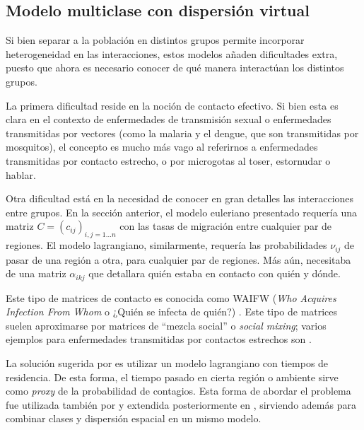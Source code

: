 \subsection{Modelo multiclase con dispersión virtual}\label{modelo-clases-vs-ambientes}

Si bien separar a la población en distintos grupos permite incorporar heterogeneidad en las interacciones, estos modelos añaden dificultades extra, puesto que ahora es necesario conocer de qué manera interactúan los distintos grupos.

La primera dificultad reside en la noción de contacto efectivo. Si bien esta es clara en el contexto de enfermedades de transmisión sexual o enfermedades transmitidas por vectores (como la malaria y el dengue, que son transmitidas por mosquitos), el concepto es mucho más vago al referirnos a enfermedades transmitidas por contacto estrecho, o por microgotas al toser, estornudar o hablar.

Otra dificultad está en la necesidad de conocer en gran detalles las interacciones entre grupos. En la sección anterior, el modelo euleriano presentado requería una matriz \(C = (c_{ij})_{i,j = 1 \dots n} \) con las tasas de migración entre cualquier par de regiones. El modelo lagrangiano, similarmente, requería las probabilidades \(\nu_{ij}\) de pasar de una región a otra, para cualquier par de regiones. Más aún, necesitaba de una matriz \(\alpha_{ikj}\) que detallara quién estaba en contacto con quién y dónde.

Este tipo de matrices de contacto es conocida como WAIFW (\textit{Who Acquires Infection From Whom} o ¿Quién se infecta de quién?) \cite{Anderson1992}. Este tipo de matrices suelen aproximarse por matrices de ``mezcla social'' o \textit{social mixing}; varios ejemplos para enfermedades transmitidas por contactos estrechos son \cite{Wallinga2006}\cite{Edmunds2006}\cite{Mossong2008}.

La solución sugerida por \cite{Bichara2015} es utilizar un modelo lagrangiano con tiempos de residencia. De esta forma, el tiempo pasado en cierta región o ambiente sirve como \textit{proxy} de la probabilidad de contagios. Esta forma de abordar el problema fue utilizada también por \cite{Cosner2009} y extendida posteriormente en \cite{Bichara2018}, sirviendo además para combinar clases y dispersión espacial en un mismo modelo. 


